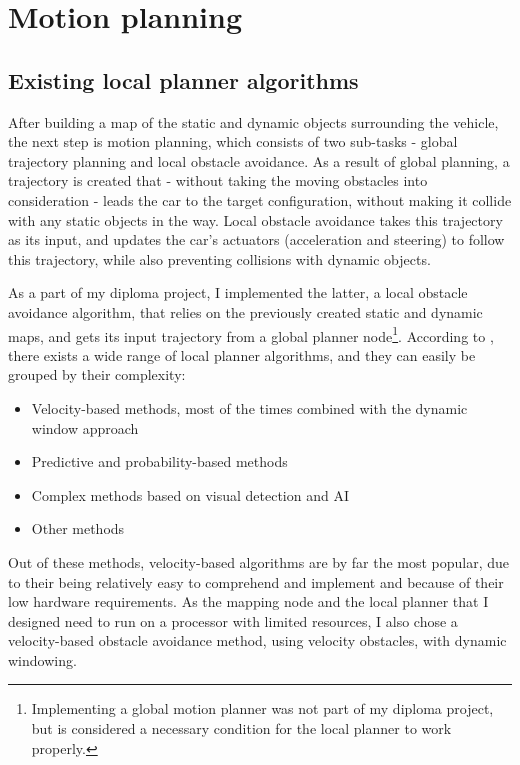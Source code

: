 \chapter{Motion planning}
\label{chap:motion_planning}

\section{Existing local planner algorithms}
\label{chap:existing_local_planner_algorithms}
After building a map of the static and dynamic objects surrounding the vehicle, the next step is motion planning, which consists of two sub-tasks - global trajectory planning and local obstacle avoidance. As a result of global planning, a trajectory is created that - without taking the moving obstacles into consideration - leads the car to the target configuration, without making it collide with any static objects in the way. Local obstacle avoidance takes this trajectory as its input, and updates the car's actuators (acceleration and steering) to follow this trajectory, while also preventing collisions with dynamic objects.

As a part of my diploma project, I implemented the latter, a local obstacle avoidance algorithm, that relies on the previously created static and dynamic maps, and gets its input trajectory from a global planner node\footnote{Implementing a global motion planner was not part of my diploma project, but is considered a necessary condition for the local planner to work properly.}. According to \cite{DynamicMotionPlanningSurvey}, there exists a wide range of local planner algorithms, and they can easily be grouped by their complexity:

\begin{itemize}
  \item Velocity-based methods, most of the times combined with the dynamic window approach
  \item Predictive and probability-based methods
  \item Complex methods based on visual detection and AI
  \item Other methods
\end{itemize}

Out of these methods, velocity-based algorithms are by far the most popular, due to their being relatively easy to comprehend and implement and because of their low hardware requirements. As the mapping node and the local planner that I designed need to run on a processor with limited resources, I also chose a velocity-based obstacle avoidance method, using velocity obstacles, with dynamic windowing.

